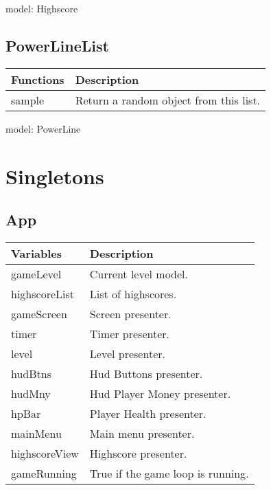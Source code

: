 	
	model: Highscore

	

\subsection*{PowerLineList}

	\begin{table}[H]
	\begin{tabular}{p{4cm} | p{8cm} }
	\hline
	\rowcolor{gray}
	Functions & Description \\ \hline
	sample & Return a random object from this list. \\ \hline
	\end{tabular}
	\end{table}

	model: PowerLine

\clearpage

\section{Singletons}

\subsection*{App}

	\begin{table}[H]
	\begin{tabular}{p{4cm} | p{8cm} }
	\hline
	\rowcolor{gray}
	Variables & Description \\ \hline
	gameLevel & Current level model. \\ \hline
  	highscoreList & List of highscores. \\ \hline
  	gameScreen & Screen presenter. \\ \hline
  	timer & Timer presenter. \\ \hline
  	level & Level presenter. \\ \hline
  	hudBtns & Hud Buttons presenter. \\ \hline
  	hudMny & Hud Player Money presenter. \\ \hline
  	hpBar & Player Health presenter. \\ \hline
  	mainMenu & Main menu presenter. \\ \hline
  	highscoreView & Highscore presenter. \\ \hline
  	gameRunning & True if the game loop is running. \\ \hline
	
	\end{tabular}
	\end{table}

